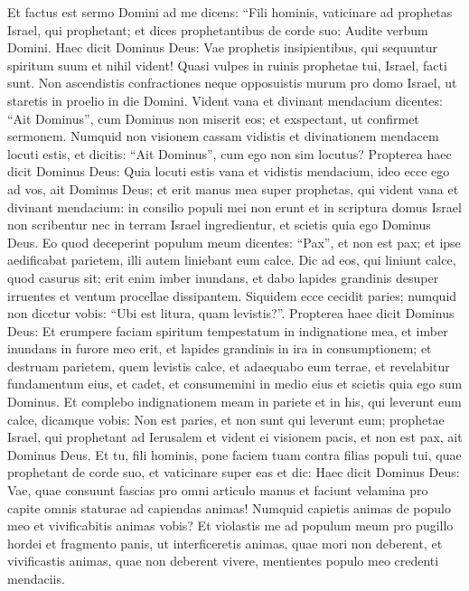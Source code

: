 \begin{biblechapter}  
\verse Et factus est sermo Domini ad me dicens: 
\verse “Fili hominis, vaticinare ad prophetas Israel, qui prophetant; et dices prophetantibus de corde suo: Audite verbum Domini. 
\verse Haec dicit Dominus Deus: Vae prophetis insipientibus, qui sequuntur spiritum suum et nihil vident! 
\verse Quasi vulpes in ruinis prophetae tui, Israel, facti sunt. 
\verse Non ascendistis confractiones neque opposuistis murum pro domo Israel, ut staretis in proelio in die Domini.  
\verse Vident vana et divinant mendacium dicentes: “Ait Dominus”, cum Dominus non miserit eos; et exspectant, ut confirmet sermonem. 
\verse Numquid non visionem cassam vidistis et divinationem mendacem locuti estis, et dicitis: “Ait Dominus”, cum ego non sim locutus? 
\verse Propterea haec dicit Dominus Deus: Quia locuti estis vana et vidistis mendacium, ideo ecce ego ad vos, ait Dominus Deus; 
\verse et erit manus mea super prophetas, qui vident vana et divinant mendacium: in consilio populi mei non erunt et in scriptura domus Israel non scribentur nec in terram Israel ingredientur, et scietis quia ego Dominus Deus. 
\verse Eo quod deceperint populum meum dicentes: “Pax”, et non est pax; et ipse aedificabat parietem, illi autem liniebant eum calce. 
\verse Dic ad eos, qui liniunt calce, quod casurus sit; erit enim imber inundans, et dabo lapides grandinis desuper irruentes et ventum procellae dissipantem. 
\verse Siquidem ecce cecidit paries; numquid non dicetur vobis: “Ubi est litura, quam levistis?”. 
\verse Propterea haec dicit Dominus Deus: Et erumpere faciam spiritum tempestatum in indignatione mea, et imber inundans in furore meo erit, et lapides grandinis in ira in consumptionem;  
\verse et destruam parietem, quem levistis calce, et adaequabo eum terrae, et revelabitur fundamentum eius, et cadet, et consumemini in medio eius et scietis quia ego sum Dominus. 
\verse Et complebo indignationem meam in pariete et in his, qui leverunt eum calce, dicamque vobis: Non est paries, et non sunt qui leverunt eum; 
\verse prophetae Israel, qui prophetant ad Ierusalem et vident ei visionem pacis, et non est pax, ait Dominus Deus. 
\verse Et tu, fili hominis, pone faciem tuam contra filias populi tui, quae prophetant de corde suo, et vaticinare super eas 
\verse et dic: Haec dicit Dominus Deus: Vae, quae consuunt fascias pro omni articulo manus et faciunt velamina pro capite omnis staturae ad capiendas animas! Numquid capietis animas de populo meo et vivificabitis animas vobis? 
\verse Et violastis me ad populum meum pro pugillo hordei et fragmento panis, ut interficeretis animas, quae mori non deberent, et vivificastis animas, quae non deberent vivere, mentientes populo meo credenti mendaciis. 

\end{biblechapter}
